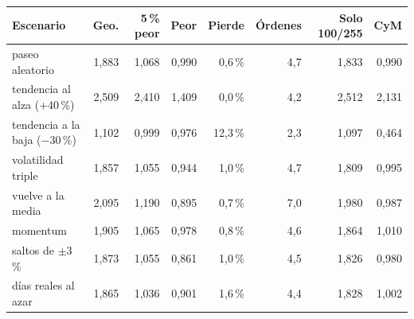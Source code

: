 \begin{tabular}{lrrrrrrr}
\toprule
Escenario & Geo. & 5\,\% peor & Peor & Pierde & Órdenes & Solo 100/255 & CyM \\
\midrule
paseo aleatorio & 1,883 & 1,068 & 0,990 & 0,6\,\% & 4,7 & 1,833 & 0,990 \\
tendencia al alza (+40\,\%) & 2,509 & 2,410 & 1,409 & 0,0\,\% & 4,2 & 2,512 & 2,131 \\
tendencia a la baja ($-$30\,\%) & 1,102 & 0,999 & 0,976 & 12,3\,\% & 2,3 & 1,097 & 0,464 \\
volatilidad triple & 1,857 & 1,055 & 0,944 & 1,0\,\% & 4,7 & 1,809 & 0,995 \\
vuelve a la media & 2,095 & 1,190 & 0,895 & 0,7\,\% & 7,0 & 1,980 & 0,987 \\
momentum & 1,905 & 1,065 & 0,978 & 0,8\,\% & 4,6 & 1,864 & 1,010 \\
saltos de $\pm$3\,\% & 1,873 & 1,055 & 0,861 & 1,0\,\% & 4,5 & 1,826 & 0,980 \\
días reales al azar & 1,865 & 1,036 & 0,901 & 1,6\,\% & 4,4 & 1,828 & 1,002 \\
\bottomrule
\end{tabular}
